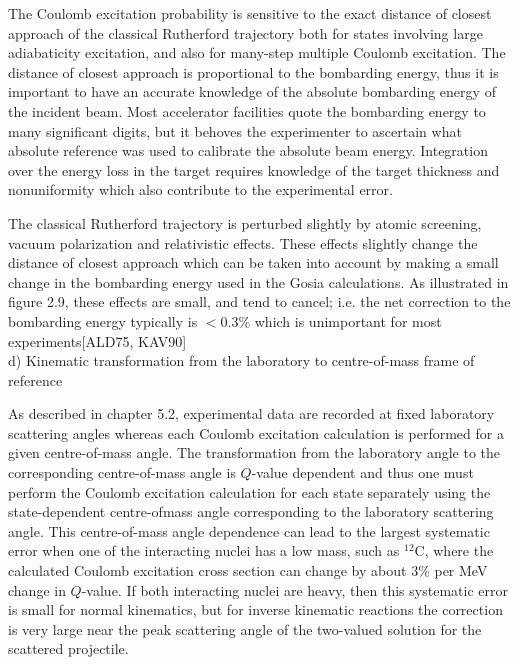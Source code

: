 \documentclass[10pt]{article}
\begin{document}
The Coulomb excitation probability is sensitive to the exact distance of closest approach of the classical Rutherford trajectory both for states involving large adiabaticity excitation, and also for many-step multiple Coulomb excitation. The distance of closest approach is proportional to the bombarding energy, thus it is important to have an accurate knowledge of the absolute bombarding energy of the incident beam. Most accelerator facilities quote the bombarding energy to many significant digits, but it behoves the experimenter to ascertain what absolute reference was used to calibrate the absolute beam energy. Integration over the energy loss in the target requires knowledge of the target thickness and nonuniformity which also contribute to the experimental error.

The classical Rutherford trajectory is perturbed slightly by atomic screening, vacuum polarization and relativistic effects. These effects slightly change the distance of closest approach which can be taken into account by making a small change in the bombarding energy used in the Gosia calculations. As illustrated in figure 2.9, these effects are small, and tend to cancel; i.e. the net correction to the bombarding energy typically is $<0.3 \%$ which is unimportant for most experiments[ALD75, KAV90]\\
d) Kinematic transformation from the laboratory to centre-of-mass frame of reference

As described in chapter 5.2, experimental data are recorded at fixed laboratory scattering angles whereas each Coulomb excitation calculation is performed for a given centre-of-mass angle. The transformation from the laboratory angle to the corresponding centre-of-mass angle is $Q$-value dependent and thus one must perform the Coulomb excitation calculation for each state separately using the state-dependent centre-ofmass angle corresponding to the laboratory scattering angle. This centre-of-mass angle dependence can lead to the largest systematic error when one of the interacting nuclei has a low mass, such as ${ }^{12} \mathrm{C}$, where the calculated Coulomb excitation cross section can change by about $3 \%$ per MeV change in $Q$-value. If both interacting nuclei are heavy, then this systematic error is small for normal kinematics, but for inverse kinematic reactions the correction is very large near the peak scattering angle of the two-valued solution for the scattered projectile.
\end{document}
